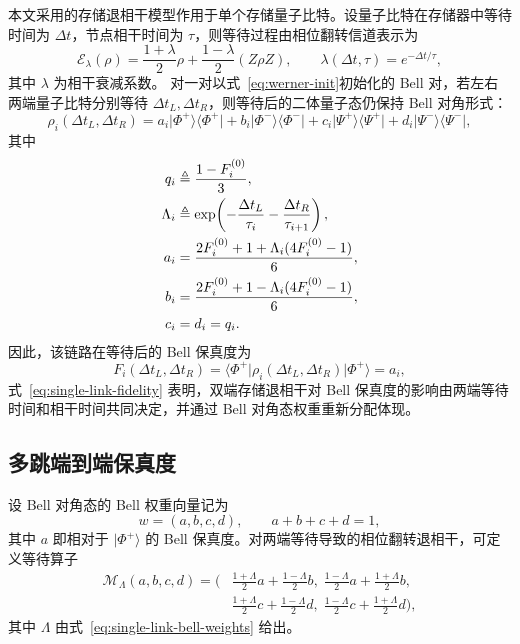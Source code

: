 本文采用的存储退相干模型作用于单个存储量子比特。设量子比特在存储器中等待时间为 $\Delta t$，节点相干时间为 $\tau$，则等待过程由相位翻转信道表示为
\begin{equation}
  \mathcal{E}_{\lambda}(\rho)
  = \frac{1 + \lambda}{2}\rho
  + \frac{1 - \lambda}{2}(Z\rho Z),
  \qquad
  \lambda(\Delta t, \tau) = e^{-\Delta t / \tau},
  \label{eq:phase-flip-memory}
\end{equation}
其中 $\lambda$ 为相干衰减系数。
对一对以式~\eqref{eq:werner-init}初始化的 Bell 对，若左右两端量子比特分别等待 $\Delta t_L,\Delta t_R$，则等待后的二体量子态仍保持 Bell 对角形式：
\begin{equation}
  \rho_i(\Delta t_L, \Delta t_R)
  = a_i \vert\Phi^+\rangle\langle\Phi^+\vert
  + b_i \vert\Phi^-\rangle\langle\Phi^-\vert
  + c_i \vert\Psi^+\rangle\langle\Psi^+\vert
  + d_i \vert\Psi^-\rangle\langle\Psi^-\vert,
  \label{eq:single-link-bell-diagonal}
\end{equation}
其中
\begin{align}
  q_i &\triangleq \frac{1 - F_i^{(0)}}{3}, \notag\\
  \Lambda_i &\triangleq
    \exp\!\left(-\frac{\Delta t_L}{\tau_i} - \frac{\Delta t_R}{\tau_{i+1}}\right), \notag\\
  a_i &= \frac{2F_i^{(0)} + 1 + \Lambda_i(4F_i^{(0)} - 1)}{6}, \notag\\
  b_i &= \frac{2F_i^{(0)} + 1 - \Lambda_i(4F_i^{(0)} - 1)}{6}, \notag\\
  c_i &= d_i = q_i. \label{eq:single-link-bell-weights}
\end{align}
因此，该链路在等待后的 Bell 保真度为
\begin{equation}
  F_i(\Delta t_L, \Delta t_R)
  = \langle\Phi^+\vert \rho_i(\Delta t_L, \Delta t_R) \vert\Phi^+\rangle
  = a_i,
  \label{eq:single-link-fidelity}
\end{equation}
式~\eqref{eq:single-link-fidelity} 表明，双端存储退相干对 Bell 保真度的影响由两端等待时间和相干时间共同决定，并通过 Bell 对角态权重重新分配体现。

\subsection{多跳端到端保真度}

设 Bell 对角态的 Bell 权重向量记为
\begin{equation}
  w = (a, b, c, d),
  \qquad a + b + c + d = 1,
\end{equation}
其中 $a$ 即相对于 $\vert\Phi^+\rangle$ 的 Bell 保真度。对两端等待导致的相位翻转退相干，可定义等待算子
\begin{equation}
  \begin{aligned}
  \mathcal{M}_{\Lambda}(a, b, c, d)
  =
  \biggl(&
    \frac{1 + \Lambda}{2}a + \frac{1 - \Lambda}{2}b,\;
    \frac{1 - \Lambda}{2}a + \frac{1 + \Lambda}{2}b, \\
  &
    \frac{1 + \Lambda}{2}c + \frac{1 - \Lambda}{2}d,\;
    \frac{1 - \Lambda}{2}c + \frac{1 + \Lambda}{2}d
  \biggr),
  \end{aligned}
  \label{eq:bell-memory-operator}
\end{equation}
其中 $\Lambda$ 由式~\eqref{eq:single-link-bell-weights} 给出。

